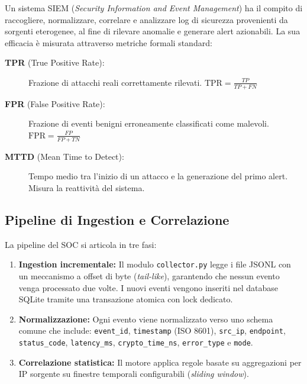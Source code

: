 \documentclass[12pt,a4paper]{article}
\begin{document}
Un sistema SIEM (\emph{Security Information and Event Management}) ha il compito di
raccogliere, normalizzare, correlare e analizzare log di sicurezza provenienti da sorgenti
eterogenee, al fine di rilevare anomalie e generare alert azionabili. La sua efficacia
è misurata attraverso metriche formali standard:

\begin{description}
  \item[\textbf{TPR} (True Positive Rate):] Frazione di attacchi reali correttamente rilevati.
        $\text{TPR} = \frac{TP}{TP + FN}$
  \item[\textbf{FPR} (False Positive Rate):] Frazione di eventi benigni erroneamente classificati
        come malevoli. $\text{FPR} = \frac{FP}{FP + TN}$
  \item[\textbf{MTTD} (Mean Time to Detect):] Tempo medio tra l'inizio di un attacco e la
        generazione del primo alert. Misura la reattività del sistema.
\end{description}

\subsection{Pipeline di Ingestion e Correlazione}

La pipeline del SOC si articola in tre fasi:

\begin{enumerate}
  \item \textbf{Ingestion incrementale:} Il modulo \texttt{collector.py} legge i file JSONL
        con un meccanismo a offset di byte (\emph{tail-like}), garantendo che nessun evento
        venga processato due volte. I nuovi eventi vengono inseriti nel database SQLite tramite
        una transazione atomica con lock dedicato.

  \item \textbf{Normalizzazione:} Ogni evento viene normalizzato verso uno schema comune
        che include: \texttt{event\_id}, \texttt{timestamp} (ISO 8601), \texttt{src\_ip},
        \texttt{endpoint}, \texttt{status\_code}, \texttt{latency\_ms},
        \texttt{crypto\_time\_ns}, \texttt{error\_type} e \texttt{mode}.

  \item \textbf{Correlazione statistica:} Il motore applica regole basate su aggregazioni
        per IP sorgente su finestre temporali configurabili (\emph{sliding window}).
\end{enumerate}
\end{document}
